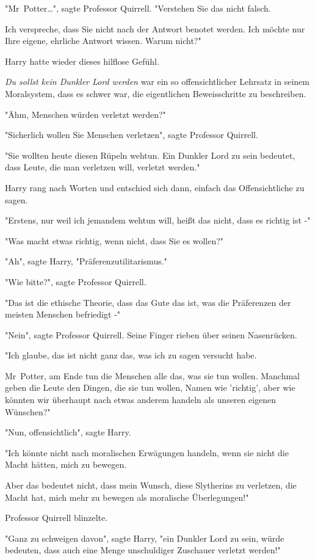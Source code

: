 {"Mr~Potter…", sagte Professor Quirrell. "Verstehen Sie das nicht falsch.

Ich verspreche, dass Sie nicht nach der Antwort benotet werden. Ich möchte nur Ihre eigene, ehrliche Antwort wissen. Warum nicht?"

Harry hatte wieder dieses hilflose Gefühl.

\emph{Du sollst kein Dunkler Lord werden} war ein so offensichtlicher Lehrsatz in seinem Moralsystem, dass es schwer war, die eigentlichen Beweisschritte zu beschreiben.

"Ähm, Menschen würden verletzt werden?"

"Sicherlich wollen Sie Menschen verletzen", sagte Professor Quirrell.

"Sie wollten heute diesen Rüpeln wehtun. Ein Dunkler Lord zu sein bedeutet, dass Leute, die man verletzen will, verletzt werden."

Harry rang nach Worten und entschied sich dann, einfach das Offensichtliche zu sagen.

"Erstens, nur weil ich jemandem wehtun will, heißt das nicht, dass es richtig ist -"

"Was macht etwas richtig, wenn nicht, dass Sie es wollen?"

"Ah", sagte Harry, "Präferenzutilitarismus."

"Wie bitte?", sagte Professor Quirrell.

"Das ist die ethische Theorie, dass das Gute das ist, was die Präferenzen der meisten Menschen befriedigt -"

"Nein", sagte Professor Quirrell. Seine Finger rieben über seinen Nasenrücken.

"Ich glaube, das ist nicht ganz das, was ich zu sagen versucht habe.

Mr~Potter, am Ende tun die Menschen alle das, was sie tun wollen. Manchmal geben die Leute den Dingen, die sie tun wollen, Namen wie 'richtig', aber wie könnten wir überhaupt nach etwas anderem handeln als unseren eigenen Wünschen?"

"Nun, offensichtlich", sagte Harry.

"Ich könnte nicht nach moralischen Erwägungen handeln, wenn sie nicht die Macht hätten, mich zu bewegen.

Aber das bedeutet nicht, dass mein Wunsch, diese Slytherins zu verletzen, die Macht hat, mich mehr zu bewegen als moralische Überlegungen!"

Professor Quirrell blinzelte.

"Ganz zu schweigen davon", sagte Harry, "ein Dunkler Lord zu sein, würde bedeuten, dass auch eine Menge unschuldiger Zuschauer verletzt werden!"

}
